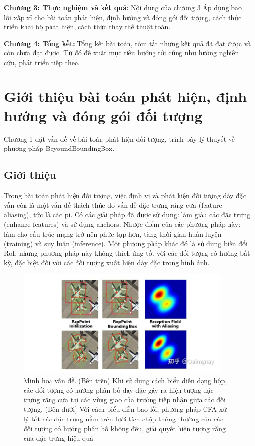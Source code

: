 \documentclass[12pt,a4paper,openany,oneside]{report}
\begin{document}
\textbf{Chương 3: Thực nghiệm và kết quả:}
Nội dung của chương 3 Áp dụng bao lồi xấp xỉ cho bài toán phát hiện, định hướng và đóng gói đối tượng, cách thức triển khai bộ phát hiện, cách thức thay thế thuật toán.


\textbf{Chương 4: Tổng kết:}
Tổng kết bài toán, tóm tắt những kết quả đã đạt được và còn chưa đạt được. Từ đó đề xuất mục tiêu hướng tới cũng như hướng nghiên cứu, phát triển tiếp theo.



 


\chapter{Giới thiệu bài toán phát hiện, định hướng và đóng gói đối tượng}

Chương 1 đặt vấn đề về bài toán phát hiện đối tượng, trình bày lý thuyết về phương pháp BeyoundBoundingBox.



\section{Giới thiệu}
Trong bài toán phát hiện đối tượng, việc định vị và phát hiện đối tượng dày đặc vẫn còn là một vấn đề thách thức do vấn đề đặc trưng răng cưa (feature aliasing), tức là các pi. Có các giải pháp đã được sử dụng: làm giàu các đặc trưng (enhance features) và sử dụng anchors. Nhược điểm của các phương pháp này: làm cho cấu trúc mạng trở nên phức tạp hơn, tăng thời gian huấn luyện (training) và suy luận (inference). Một phương pháp khác đó là sử dụng biến đổi RoI, nhưng phương pháp này không thích ứng tốt với các đối tượng có hướng bất kỳ, đặc biệt đối với các đối tượng xuất hiện dày đặc trong hình ảnh.


\begin{figure}[ht!]
	\begin{center}
		\includegraphics[width=400px]{./compare_cfa_with_other.JPG}
		\caption{Minh hoạ vấn đề. (Bên trên) Khi sử dụng cách biểu diễn dạng hộp, các đối tượng có hướng phân bố dày đặc gây ra hiện tượng đặc trưng răng cưa tại các vùng giao của trường tiếp nhận giữa các đối tượng. (Bên dưới) Với cách biểu diễn bao lồi, phương pháp CFA xử lý tốt các đặc trưng nằm trên lưới tích chập thông thường của các đối tượng có hướng phân bố không đều, giải quyết hiện tượng răng cưa đặc trưng hiệu quả}
		\label{fig_dhandang1}
	\end{center}
\end{figure} 
\end{document}
